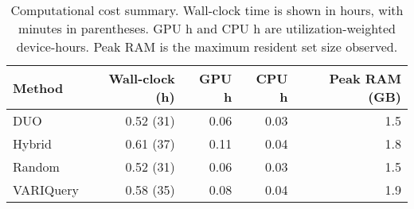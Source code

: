 \begin{table}[h]
  \centering
  \begin{tabular}{lrrrr}
    \toprule
    \textbf{Method} & \textbf{Wall-clock (h)} & \textbf{GPU h} & \textbf{CPU h} & \textbf{Peak RAM (GB)} \\
    \midrule
    DUO        & 0.52 (31)       & 0.06   & 0.03   & 1.5            \\
    Hybrid     & 0.61 (37)       & 0.11   & 0.04   & 1.8            \\
    Random     & 0.52 (31)       & 0.06   & 0.03   & 1.5            \\
    VARIQuery  & 0.58 (35)       & 0.08   & 0.04   & 1.9            \\
    \bottomrule
  \end{tabular}
  \caption{Computational cost summary. Wall-clock time is shown in hours, with minutes in parentheses. GPU h and CPU h are utilization-weighted device-hours. Peak RAM is the maximum resident set size observed.}
  \label{tab:results:overhead}
\end{table}